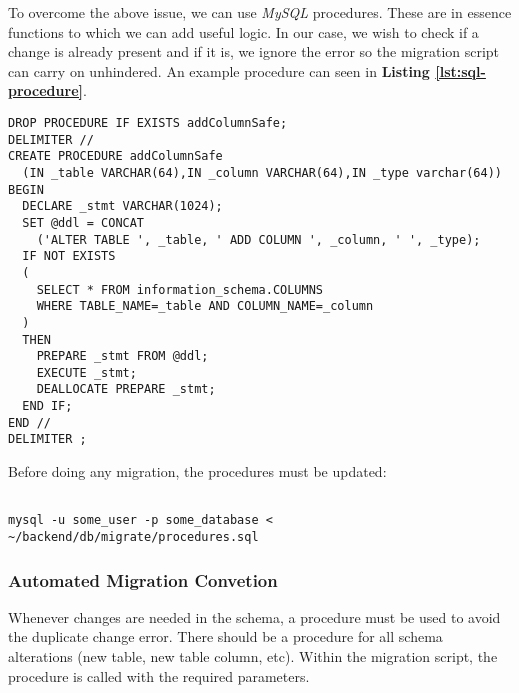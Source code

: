To overcome the above issue, we can use \textit{MySQL} procedures. These are in essence functions to which we can add useful logic. In our case, we wish to check if a change is already present and if it is, we ignore the error so the migration script can carry on unhindered. An example procedure can seen in \textbf{Listing \ref{lst:sql-procedure}}.

\begin{listing}[H]
\begin{verbatim}
DROP PROCEDURE IF EXISTS addColumnSafe;
DELIMITER //
CREATE PROCEDURE addColumnSafe
  (IN _table VARCHAR(64),IN _column VARCHAR(64),IN _type varchar(64))
BEGIN
  DECLARE _stmt VARCHAR(1024);
  SET @ddl = CONCAT
    ('ALTER TABLE ', _table, ' ADD COLUMN ', _column, ' ', _type);
  IF NOT EXISTS
  (
    SELECT * FROM information_schema.COLUMNS
    WHERE TABLE_NAME=_table AND COLUMN_NAME=_column
  )
  THEN
    PREPARE _stmt FROM @ddl;
    EXECUTE _stmt;
    DEALLOCATE PREPARE _stmt;
  END IF;
END //
DELIMITER ;
\end{verbatim}
\label{lst:sql-procedure}
\end{listing}

\pagebreak

Before doing any migration, the procedures must be updated:

\begin{listing}[H]
\begin{verbatim}

mysql -u some_user -p some_database < ~/backend/db/migrate/procedures.sql

\end{verbatim}
\label{lst:updating-sql-procedures}
\end{listing}

\subsubsection{Automated Migration Convetion}
\label{subsubsec:automated-migration-convention}

Whenever changes are needed in the schema, a procedure must be used to avoid the duplicate change error. There should be a procedure for all schema alterations (new table, new table column, etc). Within the migration script, the procedure is called with the required parameters.

